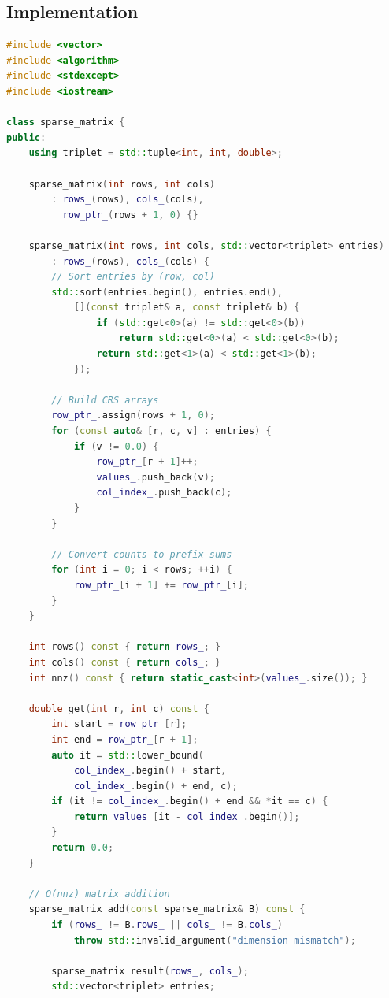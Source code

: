 \subsection{Implementation}

\begin{lstlisting}[language=C++]
#include <vector>
#include <algorithm>
#include <stdexcept>
#include <iostream>

class sparse_matrix {
public:
    using triplet = std::tuple<int, int, double>;

    sparse_matrix(int rows, int cols)
        : rows_(rows), cols_(cols),
          row_ptr_(rows + 1, 0) {}

    sparse_matrix(int rows, int cols, std::vector<triplet> entries)
        : rows_(rows), cols_(cols) {
        // Sort entries by (row, col)
        std::sort(entries.begin(), entries.end(),
            [](const triplet& a, const triplet& b) {
                if (std::get<0>(a) != std::get<0>(b))
                    return std::get<0>(a) < std::get<0>(b);
                return std::get<1>(a) < std::get<1>(b);
            });

        // Build CRS arrays
        row_ptr_.assign(rows + 1, 0);
        for (const auto& [r, c, v] : entries) {
            if (v != 0.0) {
                row_ptr_[r + 1]++;
                values_.push_back(v);
                col_index_.push_back(c);
            }
        }

        // Convert counts to prefix sums
        for (int i = 0; i < rows; ++i) {
            row_ptr_[i + 1] += row_ptr_[i];
        }
    }

    int rows() const { return rows_; }
    int cols() const { return cols_; }
    int nnz() const { return static_cast<int>(values_.size()); }

    double get(int r, int c) const {
        int start = row_ptr_[r];
        int end = row_ptr_[r + 1];
        auto it = std::lower_bound(
            col_index_.begin() + start,
            col_index_.begin() + end, c);
        if (it != col_index_.begin() + end && *it == c) {
            return values_[it - col_index_.begin()];
        }
        return 0.0;
    }

    // O(nnz) matrix addition
    sparse_matrix add(const sparse_matrix& B) const {
        if (rows_ != B.rows_ || cols_ != B.cols_)
            throw std::invalid_argument("dimension mismatch");

        sparse_matrix result(rows_, cols_);
        std::vector<triplet> entries;


\end{lstlisting}
